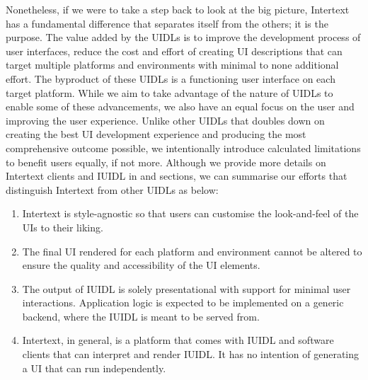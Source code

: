 Nonetheless, if we were to take a step back to look at the big picture, Intertext has a fundamental difference that separates itself from the others; it is the purpose. The value added by the UIDLs is to improve the development process of user interfaces, reduce the cost and effort of creating UI descriptions that can target multiple platforms and environments with minimal to none additional effort. The byproduct of these UIDLs is a functioning user interface on each target platform. While we aim to take advantage of the nature of UIDLs to enable some of these advancements, we also have an equal focus on the user and improving the user experience. Unlike other UIDLs that doubles down on creating the best UI development experience and producing the most comprehensive outcome possible, we intentionally introduce calculated limitations to benefit users equally, if not more. Although we provide more details on Intertext clients and IUIDL in  and  sections, we can summarise our efforts that distinguish Intertext from other UIDLs as below:

\begin{enumerate}
  \item Intertext is style-agnostic so that users can customise the look-and-feel of the UIs to their liking.
  
  \item The final UI rendered for each platform and environment cannot be altered to ensure the quality and accessibility of the UI elements.
  
  \item The output of IUIDL is solely presentational with support for minimal user interactions. Application logic is expected to be implemented on a generic backend, where the IUIDL is meant to be served from.

  \item Intertext, in general, is a platform that comes with IUIDL and software clients that can interpret and render IUIDL. It has no intention of generating a UI that can run independently.
\end{enumerate}
